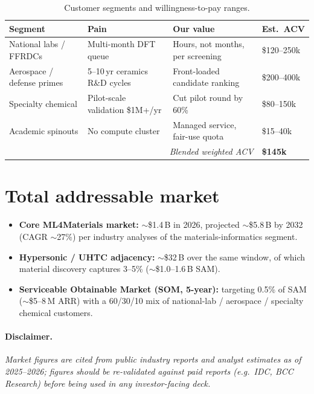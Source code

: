 \documentclass[11pt,a4paper]{report}
\begin{document}
\begin{table}[h]
\centering
\caption{Customer segments and willingness-to-pay ranges.}
\label{tab:segments}
\begin{tabular}{p{4.0cm}p{4.2cm}p{3.5cm}p{2.5cm}}
\toprule
\textbf{Segment} & \textbf{Pain} & \textbf{Our value} & \textbf{Est.\ ACV} \\
\midrule
National labs / FFRDCs & Multi-month DFT queue & Hours, not months, per screening & \$120--250k \\
Aerospace / defense primes & 5--10\,yr ceramics R\&D cycles & Front-loaded candidate ranking & \$200--400k \\
Specialty chemical & Pilot-scale validation \$1M+/yr & Cut pilot round by 60\% & \$80--150k \\
Academic spinouts & No compute cluster & Managed service, fair-use quota & \$15--40k \\
\midrule
\multicolumn{3}{r}{\textit{Blended weighted ACV}} & \textbf{\$145k} \\
\bottomrule
\end{tabular}
\end{table}

\section{Total addressable market}

\begin{itemize}[leftmargin=*,itemsep=2pt]
\item \textbf{Core ML4Materials market:} $\sim$\$1.4\,B in 2026, projected $\sim$\$5.8\,B by
      2032 (CAGR $\sim$27\%) per industry analyses of the materials-informatics segment.
\item \textbf{Hypersonic / UHTC adjacency:} $\sim$\$32\,B over the same window, of which
      material discovery captures 3--5\% ($\sim$\$1.0--1.6\,B SAM).
\item \textbf{Serviceable Obtainable Market (SOM, 5-year):} targeting 0.5\% of SAM
      ($\sim$\$5--8\,M ARR) with a 60/30/10 mix of national-lab / aerospace / specialty
      chemical customers.
\end{itemize}

\paragraph{Disclaimer.}
\textit{Market figures are cited from public industry reports and analyst estimates as of
2025--2026; figures should be re-validated against paid reports (e.g.\ IDC, BCC Research)
before being used in any investor-facing deck.}
\end{document}
